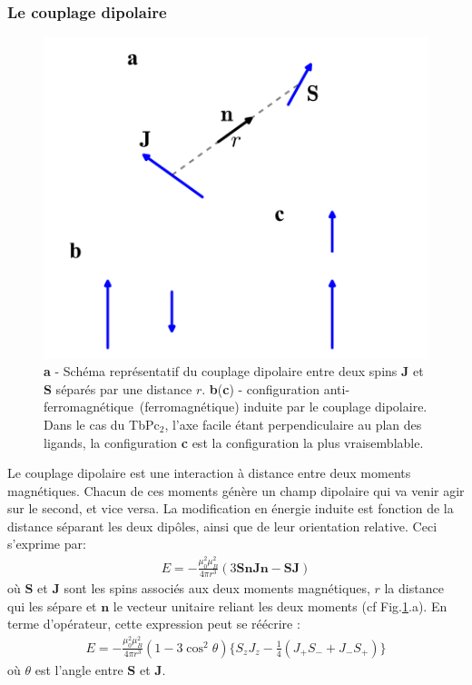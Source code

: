 \subsubsection{Le couplage dipolaire}

\begin{figure}
\parbox{6.5cm}{
\includegraphics[scale=0.45]{Resultats/CDipolaire/CDipolaire.pdf} 
}
\parbox{7cm}{\caption{\textbf{a} - Schéma représentatif du couplage dipolaire entre deux spins \textbf{J} et \textbf{S} séparés par une distance $r$. \textbf{b}(\textbf{c}) - configuration anti-ferromagnétique~(ferromagnétique) induite par le couplage dipolaire. Dans le cas du TbPc$_2$, l'axe facile étant perpendiculaire au plan des ligands, la configuration \textbf{c} est la configuration la plus vraisemblable.}
\label{dipolaire}
}
\end{figure}


Le couplage dipolaire est une interaction à distance entre deux moments magnétiques. Chacun de ces moments génère un champ dipolaire qui va venir agir sur le second, et vice versa. La modification en énergie induite est fonction de la distance séparant les deux dipôles, ainsi que de leur orientation relative. Ceci s'exprime par:
\begin{eqnarray}
E = -\frac{\mu_0^2 \mu_B^2}{4\pi r^3}(3\mathbf{SnJn} - \mathbf{SJ}) \nonumber
\end{eqnarray}
où $\mathbf{S}$ et $\mathbf{J}$ sont les spins associés aux deux moments magnétiques, $r$ la distance qui les sépare et $\mathbf{n}$ le vecteur unitaire reliant les deux moments (cf Fig.\ref{dipolaire}.a). En terme d'opérateur, cette expression peut se réécrire :
\begin{eqnarray}
E = -\frac{\mu_0^2 \mu_B^2}{4\pi r^3}(1 - 3 \cos^2 \theta) \lbrace S_zJ_z - \frac{1}{4}(J_+S_- + J_-S_+)\rbrace \nonumber
\end{eqnarray}
où $\theta$ est l'angle entre $\mathbf{S}$ et $\mathbf{J}$.

